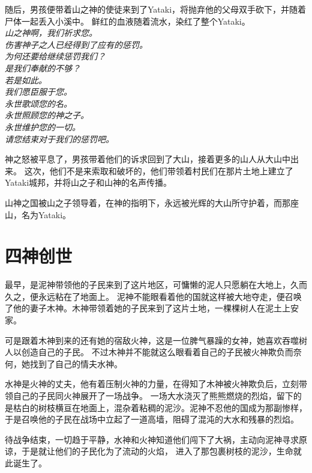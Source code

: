 \documentclass[UTF8,12pt]{ctexbook}
\begin{document}
            随后，男孩便带着山之神的使徒来到了Yataki，将抛弃他的父母双手砍下，并随着尸体一起丢入小溪中。
            鲜红的血液随着流水，染红了整个Yataki。
            \emph{
            \\山之神啊，我们祈求您。
            \\伤害神子之人已经得到了应有的惩罚。
            \\为何还要给继续惩罚我们？
            \\是我们奉献的不够？
            \\若是如此。
            \\我们愿臣服于您。
            \\永世歌颂您的名。
            \\永世照顾您的神之子。
            \\永世维护您的一切。
            \\请您结束对于我们的惩罚吧。
            }

            神之怒被平息了，男孩带着他们的诉求回到了大山，接着更多的山人从大山中出来。
            这次，他们不是来索取和破坏的，他们带领着村民们在那片土地上建立了Yataki城邦，并将山之子和山神的名声传播。
            
            山神之国被山之子领导着，在神的指明下，永远被光辉的大山所守护着，而那座山，名为Yataki。
        \section{四神创世}
            最早，是泥神带领他的子民来到了这片地区，可慵懒的泥人只愿躺在大地上，久而久之，便永远粘在了地面上。
            泥神不能眼看着他的国就这样被大地夺走，便召唤了他的妻子木神。木神带领着她的子民来到了这片土地，一棵棵树人在泥土上安家。
            
            可是跟着木神到来的还有她的宿敌火神，这是一位脾气暴躁的女神，她喜欢吞噬树人以创造自己的子民。
            不过木神并不能就这么眼看着自己的子民被火神欺负而奈何，她找到了自己的情夫水神。
            
            水神是火神的丈夫，他有着压制火神的力量，在得知了木神被火神欺负后，立刻带领自己的子民同火神展开了一场战争。
            一场大水浇灭了熊熊燃烧的烈焰，留下的是枯白的树枝横亘在地面上，混杂着粘稠的泥沙。泥神不忍他的国成为那副惨样，
            于是召唤他的子民在战场中立起了一道高墙，阻碍了混沌的大水和残暴的烈焰。

            待战争结束，一切趋于平静，水神和火神知道他们闯下了大祸，主动向泥神寻求原谅，于是就让他们的子民化为了流动的火焰，
            进入了那包裹树枝的泥沙，生命就此诞生了。
\end{document}
